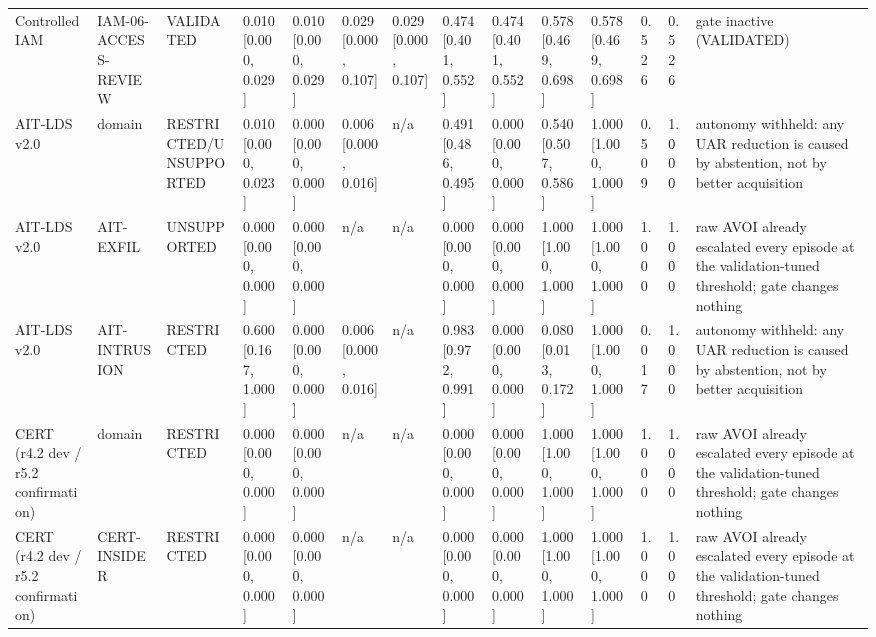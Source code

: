 \begin{table}[!ht]
{\begin{tabular}{llllllllllllll}
Controlled IAM & IAM-06-ACCESS-REVIEW & VALIDATED & 0.010 [0.000, 0.029] & 0.010 [0.000, 0.029] & 0.029 [0.000, 0.107] & 0.029 [0.000, 0.107] & 0.474 [0.401, 0.552] & 0.474 [0.401, 0.552] & 0.578 [0.469, 0.698] & 0.578 [0.469, 0.698] & 0.526 & 0.526 & gate inactive (VALIDATED) \\
AIT-LDS v2.0 & domain & RESTRICTED/UNSUPPORTED & 0.010 [0.000, 0.023] & 0.000 [0.000, 0.000] & 0.006 [0.000, 0.016] & n/a & 0.491 [0.486, 0.495] & 0.000 [0.000, 0.000] & 0.540 [0.507, 0.586] & 1.000 [1.000, 1.000] & 0.509 & 1.000 & autonomy withheld: any UAR reduction is caused by abstention, not by better acquisition \\
AIT-LDS v2.0 & AIT-EXFIL & UNSUPPORTED & 0.000 [0.000, 0.000] & 0.000 [0.000, 0.000] & n/a & n/a & 0.000 [0.000, 0.000] & 0.000 [0.000, 0.000] & 1.000 [1.000, 1.000] & 1.000 [1.000, 1.000] & 1.000 & 1.000 & raw AVOI already escalated every episode at the validation-tuned threshold; gate changes nothing \\
AIT-LDS v2.0 & AIT-INTRUSION & RESTRICTED & 0.600 [0.167, 1.000] & 0.000 [0.000, 0.000] & 0.006 [0.000, 0.016] & n/a & 0.983 [0.972, 0.991] & 0.000 [0.000, 0.000] & 0.080 [0.013, 0.172] & 1.000 [1.000, 1.000] & 0.017 & 1.000 & autonomy withheld: any UAR reduction is caused by abstention, not by better acquisition \\
CERT (r4.2 dev / r5.2 confirmation) & domain & RESTRICTED & 0.000 [0.000, 0.000] & 0.000 [0.000, 0.000] & n/a & n/a & 0.000 [0.000, 0.000] & 0.000 [0.000, 0.000] & 1.000 [1.000, 1.000] & 1.000 [1.000, 1.000] & 1.000 & 1.000 & raw AVOI already escalated every episode at the validation-tuned threshold; gate changes nothing \\
CERT (r4.2 dev / r5.2 confirmation) & CERT-INSIDER & RESTRICTED & 0.000 [0.000, 0.000] & 0.000 [0.000, 0.000] & n/a & n/a & 0.000 [0.000, 0.000] & 0.000 [0.000, 0.000] & 1.000 [1.000, 1.000] & 1.000 [1.000, 1.000] & 1.000 & 1.000 & raw AVOI already escalated every episode at the validation-tuned threshold; gate changes nothing \\
\bottomrule
\end{tabular}}
\end{table}

